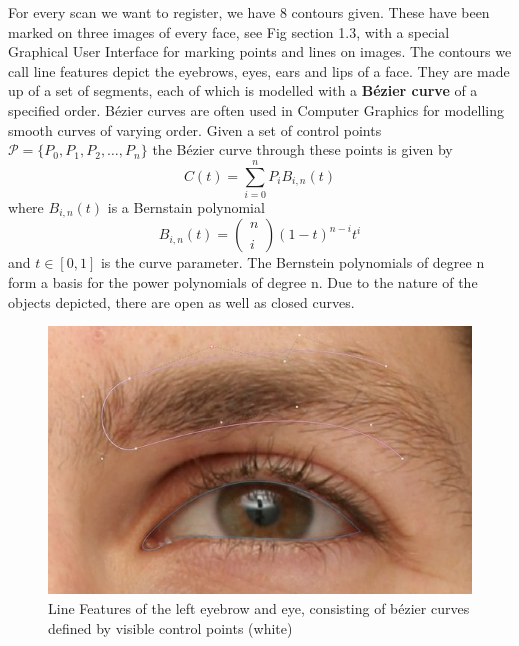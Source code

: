 For every scan we want to register, we have 8 contours given. These have been marked on three images of every face, see Fig section 1.3, with a special Graphical User Interface for marking points and lines on images. The contours we call line features depict the eyebrows, eyes, ears and lips of a face. They are made up of a set of segments, each of which is modelled with a \textbf{B\'{e}zier curve} of a specified order. B\'{e}zier curves are often used in Computer
Graphics for modelling smooth curves of varying order. Given a set of control points $\mathcal{P} = \{P_{0}, P_{1}, P_{2}, \ldots, P_{n}\}$ the B\'{e}zier curve through these points is given by
\begin{equation}
    C(t)=\sum_{i=0}^{n}P_{i}B_{i,n}(t)
\end{equation}
where $B_{i,n}(t)$ is a Bernstain polynomial 
\begin{equation}
    B_{i,n}(t)=\begin{pmatrix} n \\ \\ i \end{pmatrix}(1-t)^{n-i}t^i
\end{equation}
and $t \in [0,1]$ is the curve parameter. The Bernstein polynomials of degree n form a basis for the power polynomials of degree n. 
Due to the nature of the objects depicted, there are open as well as closed curves. 

\begin{figure}[h!]
    \centering
\includegraphics[width=\textwidth]{./resources/img/eyebrow_left.jpeg}
\caption{Line Features of the left eyebrow and eye, consisting of b\'{e}zier curves defined by visible control points (white)}
\end{figure}

